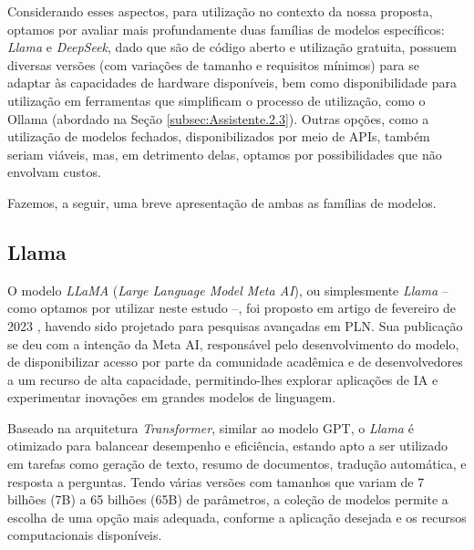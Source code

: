 Considerando esses aspectos, para utilização no contexto da nossa proposta, optamos por avaliar mais profundamente duas famílias de modelos específicos: \textit{Llama} e \textit{DeepSeek}, dado que são de código aberto e utilização gratuita, possuem diversas versões (com variações de tamanho e requisitos mínimos) para se adaptar às capacidades de hardware disponíveis, bem como disponibilidade para utilização em ferramentas que simplificam o processo de utilização, como o Ollama (abordado na Seção \ref{subsec:Assistente.2.3}). Outras opções, como a utilização de modelos fechados, disponibilizados por meio de APIs, também seriam viáveis, mas, em detrimento delas, optamos por possibilidades que não envolvam custos.

Fazemos, a seguir, uma breve apresentação de ambas as famílias de modelos.

\subsection{Llama}
\label{subsec:Assistente.2.1}
O modelo \textit{LLaMA} (\textit{Large Language Model Meta AI}), ou simplesmente \textit{Llama} -- como optamos por utilizar neste estudo --, foi proposto em artigo de fevereiro de 2023 \cite{Llama:1}, havendo sido projetado para pesquisas avançadas em \ac{PLN}. Sua publicação se deu com a intenção da Meta AI, responsável pelo desenvolvimento do modelo, de disponibilizar acesso por parte da comunidade acadêmica e de desenvolvedores a um recurso de alta capacidade, permitindo-lhes explorar aplicações de \ac{IA} e experimentar inovações em grandes modelos de linguagem.

Baseado na arquitetura \textit{Transformer}, similar ao modelo \ac{GPT}, o \textit{Llama} é otimizado para balancear desempenho e eficiência, estando apto a ser utilizado em tarefas como geração de texto, resumo de documentos, tradução automática, e resposta a perguntas. Tendo várias versões com tamanhos que variam de 7 bilhões (7B) a 65 bilhões (65B) de parâmetros, a  coleção de modelos permite a escolha de uma opção mais adequada, conforme a aplicação desejada e os recursos computacionais disponíveis.

